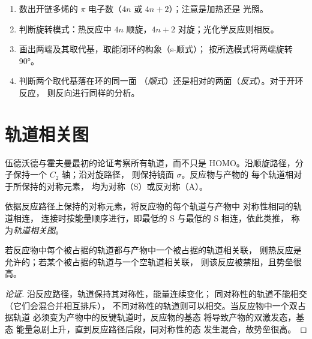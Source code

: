 \begin{method}[预测电环化反应的立体化学]\label{met:b3:pericyclic:predict-stereo}
\begin{enumerate}
  \item 数出开链多烯的 $\pi$ 电子数（$4n$ 或 $4n + 2$）；注意是加热还是
        光照。
  \item 判断旋转模式：热反应中 $4n$ 顺旋，$4n + 2$ 对旋；光化学反应则相反。
  \item 画出两端及其取代基，取能闭环的构象（s-顺式）；
        按所选模式将两端旋转 90°。
  \item 判断两个取代基落在环的同一面
        （\textit{顺式}）还是相对的两面（\textit{反式}）。对于开环反应，
        则反向进行同样的分析。
\end{enumerate}
\end{method}

\section{轨道相关图}

伍德沃德与霍夫曼最初的论证考察所有轨道，而不只是
HOMO。沿顺旋路径，分子保持一个 $C_2$ 轴；沿对旋路径，
则保持镜面 $\sigma$。反应物与产物的
每个轨道相对于所保持的对称元素，
均为对称（S）或反对称（A）。

\begin{definition}[轨道相关图]\label{def:b3:pericyclic:orbital-correlation}
依据反应路径上保持的对称元素，将反应物的每个轨道与产物中
对称性相同的轨道相连，
连接时按能量顺序进行，即最低的 S 与最低的 S 相连，依此类推，
称为\emph{轨道相关图}。
\end{definition}

\begin{proposition}[轨道对称性守恒]\label{prop:b3:pericyclic:correlation}
若反应物中每个被占据的轨道都与产物中一个被占据的轨道相关联，
则热反应是允许的；若某个被占据的轨道与一个空轨道相关联，
则该反应被禁阻，且势垒很高。
\end{proposition}

\begin{proof}[论证]
沿反应路径，轨道保持其对称性，能量连续变化；
同对称性的轨道不能相交（它们会混合并相互排斥），
不同对称性的轨道则可以相交。当反应物中一个双占据轨道
必须变为产物中的反键轨道时，反应物的基态
将导致产物的双激发态，基态
能量急剧上升，直到反应路径后段，同对称性的态
发生混合，故势垒很高。
\end{proof}

